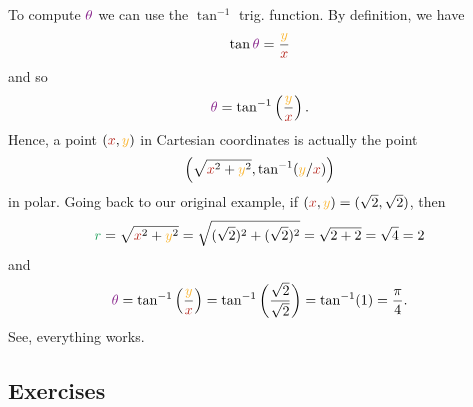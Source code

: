 \documentclass[a4paper,11pt]{article}
\newcommand{\clr}{\textcolor{BrickRed}}
\newcommand{\clg}{\textcolor{ForestGreen}}
\newcommand{\clm}{\textcolor{Fuchsia}}
\newcommand{\cly}{\textcolor{Dandelion}}
\begin{document}
To compute $\clm{\theta}$ we can use the $\tan^{-1}$ trig. function. By
definition, we have
\[
 \tan \clm{\theta} = \frac{\cly{y}}{\clr{x}}
\]
and so
\[
 \clm{\theta} = \tan^{-1}\left( \frac{\cly{y}}{\clr{x}} \right).
\]
Hence, a point $(\clr{x},\cly{y})$ in Cartesian coordinates is actually the
point
\[
 \left(\sqrt{\clr{x}^2 + \cly{y}^2}, \tan^{-1}(\cly{y}/\clr{x})\right)
\]
in polar. Going back to our original example, if $(\clr{x},\cly{y}) =
(\sqrt{2},\sqrt{2})$, then
\[
 \clg{r} = \sqrt{\clr{x}^2 + \cly{y}^2} = \sqrt{(\sqrt{2})^2 + (\sqrt{2})^2} =
 \sqrt{2 + 2} = \sqrt{4} = 2
\]
and
\[
 \clm{\theta} = \tan^{-1}\left( \frac{\cly{y}}{\clr{x}} \right) =
 \tan^{-1}\left( \frac{\sqrt{2}}{\sqrt{2}} \right) = \tan^{-1}(1) =
 \frac{\pi}{4}.
\]
See, everything works.

\subsection*{Exercises}
\end{document}
